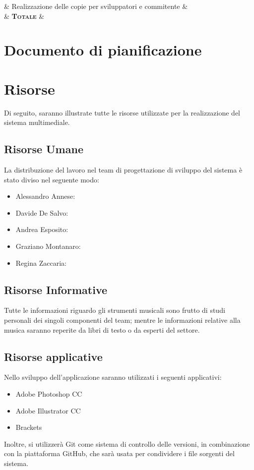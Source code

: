 \begin{longtabu}
	                                                                          & Realizzazione delle copie per sviluppatori e commitente        &                                                         \\  
	                                  & \textbf{\textsc{Totale}}                                       & \textbf{}                                               \\ \hline
\end{longtabu}

\section{Documento di pianificazione}
\section{Risorse}
Di seguito, saranno illustrate tutte le risorse utilizzate per la realizzazione del sistema multimediale.
\subsection{Risorse Umane}
La distribuzione del lavoro nel team di progettazione di sviluppo del sistema è stato diviso nel seguente modo:
\begin{itemize}
	\item Alessandro Annese: 
	\item Davide De Salvo:
	\item Andrea Esposito:
	\item Graziano Montanaro:
	\item Regina Zaccaria:
\end{itemize}

\subsection{Risorse Informative}
Tutte le informazioni riguardo gli strumenti musicali sono frutto di studi personali dei singoli componenti del team; mentre le informazioni relative alla musica saranno reperite da libri di testo o da esperti del settore.

\subsection{Risorse applicative}
Nello sviluppo dell'applicazione saranno utilizzati i seguenti applicativi:
\begin{itemize}
	\item Adobe Photoshop CC
	\item Adobe Illustrator CC
	\item Brackets
\end{itemize}
Inoltre, si utilizzerà Git come sistema di controllo delle versioni, in combinazione con la piattaforma GitHub, che sarà usata per condividere i file sorgenti del sistema.

